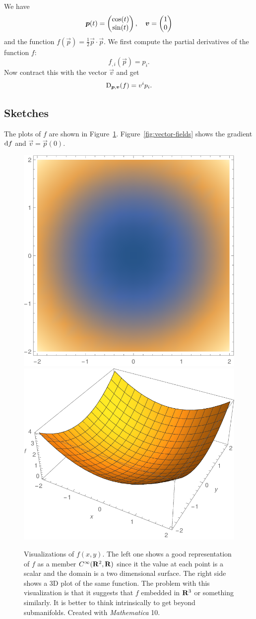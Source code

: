 \documentclass[11pt, english, fleqn, DIV=15, headinclude, BCOR=1cm]{scrartcl}
\begin{document}
We have
\[
    \boldsymbol{p}(t) =
    \begin{pmatrix}
        \cos(t) \\ \sin(t)
    \end{pmatrix}
    ,\quad
    \boldsymbol{v} =
    \begin{pmatrix}
        1 \\ 0
    \end{pmatrix}
\]
and the function $f(\vec p) = \frac12 \vec p \cdot \vec p$. We first compute
the partial derivatives of the function $f$:
\[
    f_{,i}(\vec p) = p_i.
\]
Now contract this with the vector $\vec v$ and get
\[
    \mathop{}\!\mathrm D_{\boldsymbol{p}, \boldsymbol{v}}(f) = v^i p_i.
\]

\subsection{Sketches}

The plots of $f$ are shown in Figure~\ref{fig:f}.
Figure~\ref{fig:vector-fields} shows the gradient $\mathop{}\!\mathrm d f$ and $\vec v = \vec
p(0)$.

\begin{figure}[htbp]
    \centering
    \includegraphics[width=.45\linewidth]{headmap.pdf}
    \hfill
    \includegraphics[width=.45\linewidth]{3dplot.pdf}
    \caption{%
        Visualizations of $f(x, y)$. The left one shows a good representation
        of $f$ as a member $C^\infty(\mathbf R^2, \mathbf R)$ since it the value at each
        point is a scalar and the domain is a two dimensional surface. The
        right side shows a 3D plot of the same function. The problem with this
        visualization is that it suggests that $f$ embedded in $\mathbf R^3$ or
        something similarly. It is better to think intrinsically to get beyond
        submanifolds. Created with \emph{Mathematica} 10.
    }
    \label{fig:f}
\end{figure}
\end{document}
